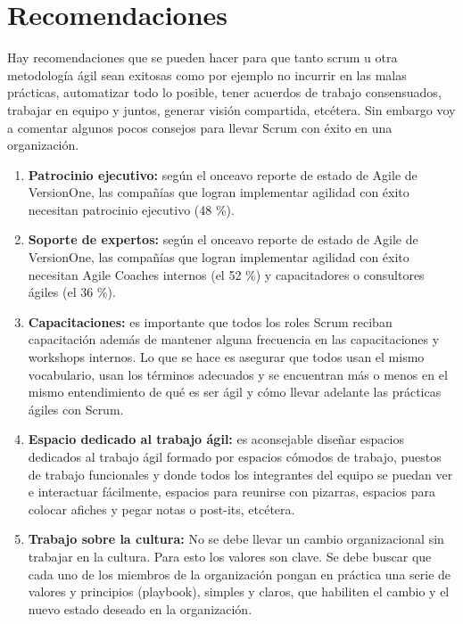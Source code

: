 \section{Recomendaciones}

Hay recomendaciones que se pueden hacer para que tanto scrum u otra metodología ágil sean exitosas como por ejemplo no incurrir en las malas prácticas, automatizar todo lo posible, tener acuerdos de trabajo consensuados, trabajar en equipo y juntos, generar visión compartida, etcétera. Sin embargo voy a comentar algunos pocos consejos para llevar Scrum con éxito en una organización.

\begin{enumerate}
\item \textbf{Patrocinio ejecutivo:} según el onceavo reporte de estado de Agile de VersionOne, las compañías que logran implementar agilidad con éxito necesitan patrocinio ejecutivo (48 \%).

\item \textbf{Soporte de expertos:} según el onceavo reporte de estado de Agile de VersionOne, las compañías que logran implementar agilidad con éxito necesitan Agile Coaches internos (el 52 \%) y capacitadores o consultores ágiles (el 36 \%).

\item \textbf{Capacitaciones:} es importante que todos los roles Scrum reciban capacitación además de mantener alguna frecuencia en las capacitaciones y workshops internos. Lo que se hace es asegurar que todos usan el mismo vocabulario, usan los términos adecuados y se encuentran más o menos en el mismo entendimiento de qué es ser ágil y cómo llevar adelante las prácticas ágiles con Scrum.

\item \textbf{Espacio dedicado al trabajo ágil:} es aconsejable diseñar espacios dedicados al trabajo ágil formado por espacios cómodos de trabajo, puestos de trabajo funcionales y donde todos los integrantes del equipo se puedan ver e interactuar fácilmente, espacios para reunirse con pizarras, espacios para colocar afiches y pegar notas o post-its, etcétera. 

\item \textbf{Trabajo sobre la cultura:} No se debe llevar un cambio organizacional sin trabajar en la cultura. Para esto los valores son clave. Se debe buscar que cada uno de los miembros de la organización pongan en práctica una serie de valores y principios (playbook), simples y claros, que habiliten el cambio y el nuevo estado deseado en la organización.

\end{enumerate}
